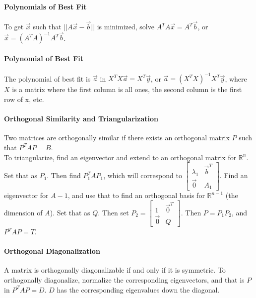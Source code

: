 \documentclass[10pt,letter]{article}
\begin{document}
\paragraph{Polynomials of Best Fit}
To get $\vec{x}$ such that $||A\vec{x}-\vec{b}||$ is minimized, solve $A^TA\vec{x}=A^T\vec{b}$, or $\vec{x}=(A^TA)^{-1}A^T\vec{b}$. \\ 

\paragraph{Polynomial of Best Fit}
The polynomial of best fit is $\vec{a}$ in $X^TX\vec{a}=X^T\vec{y}$, or $\vec{a}=(X^TX)^{-1}X^T\vec{y}$, where $X$ is a matrix where the first column is all ones, the second column is the first row of x, etc.

\paragraph{Orthogonal Similarity and Triangularization}
Two matrices are orthogonally similar if there exists an orthogonal matrix $P$ such that $P^TAP=B$. \\ 
To triangularize, find an eigenvector and extend to an orthogonal matrix for $\mathbb{R}^n$. Set that as $P_1$. Then find $P_1^TAP_1$, which will correspond to $\begin{bmatrix}\lambda_1&\vec{b}^T\\\vec{0}&A_1\end{bmatrix}$. Find an eigenvector for $A-1$, and use that to find an orthogonal basis for $\mathbb{R}^{n-1}$ (the dimension of $A$). Set that as $Q$. Then set $P_2=\begin{bmatrix}1&\vec{0}^T\\\vec{0}&Q\end{bmatrix}$. Then $P=P_1P_2$, and $P^TAP=T$. 

\paragraph{Orthogonal Diagonalization} 
A matrix is orthogonally diagonalizable if and only if it is symmetric. To orthogonally diagonalize, normalize the corresponding eigenvectors, and that is $P$ in $P^TAP=D$. $D$ has the corresponding eigenvalues down the diagonal.
\end{document}
